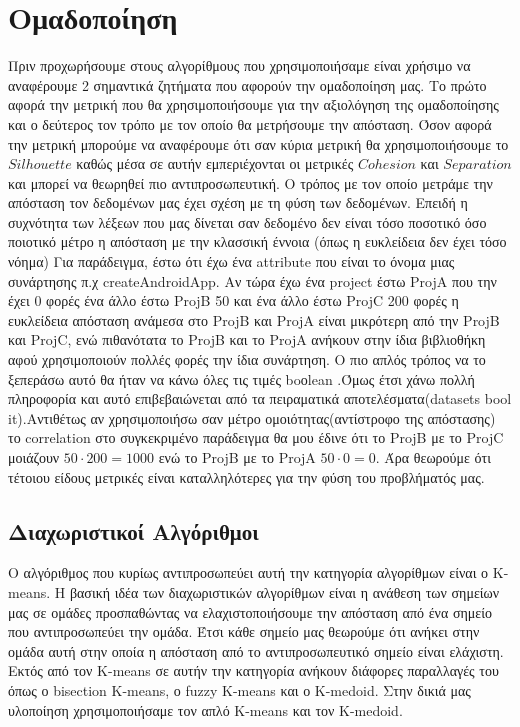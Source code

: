 \chapter{Ομαδοποίηση}
Πριν προχωρήσουμε στους αλγορίθμους που χρησιμοποιήσαμε είναι χρήσιμο να αναφέρουμε 2 σημαντικά ζητήματα που αφορούν την ομαδοποίηση μας. Το πρώτο αφορά την μετρική που θα χρησιμοποιήσουμε για την αξιολόγηση της ομαδοποίησης και ο δεύτερος τον τρόπο με τον οποίο θα μετρήσουμε την απόσταση. Όσον αφορά την μετρική μπορούμε να αναφέρουμε ότι σαν κύρια μετρική θα χρησιμοποιήσουμε το $Silhouette$ καθώς μέσα σε αυτήν εμπεριέχονται οι μετρικές $Cohesion$ και $Separation$ και μπορεί να θεωρηθεί πιο αντιπροσωπευτική.
Ο τρόπος με τον οποίο μετράμε την απόσταση τον δεδομένων μας έχει σχέση με τη φύση των δεδομένων.
Επειδή η συχνότητα των λέξεων που μας
δίνεται σαν δεδομένο δεν είναι τόσο ποσοτικό  όσο ποιοτικό μέτρο η απόσταση με την κλασσική έννοια (όπως η ευκλείδεια δεν έχει τόσο νόημα)
Για παράδειγμα, έστω ότι έχω ένα attribute που είναι το όνομα μιας συνάρτησης π.χ createAndroidApp.
Αν τώρα έχω ένα project έστω ProjA  που την έχει 0 φορές ένα άλλο έστω ProjB 50 και ένα άλλο έστω ProjC 200 φορές
η ευκλείδεια απόσταση ανάμεσα στο ProjB και ProjA είναι μικρότερη από την ProjB και ProjC, ενώ πιθανότατα το ProjB και το ProjA ανήκουν στην ίδια βιβλιοθήκη αφού χρησιμοποιούν πολλές φορές την ίδια συνάρτηση. Ο πιο απλός τρόπος να το ξεπεράσω αυτό θα ήταν να κάνω όλες τις τιμές boοlean .Όμως έτσι χάνω πολλή πληροφορία και αυτό επιβεβαιώνεται από τα πειραματικά αποτελέσματα(datasets bool it).Αντιθέτως αν χρησιμοποιήσω σαν μέτρο ομοιότητας(αντίστροφο της απόστασης) το correlation στο συγκεκριμένο παράδειγμα θα μου έδινε ότι το ProjB με το ProjC μοιάζουν $50\cdot200=1000$
ενώ το ProjB με το ProjA $50\cdot0=0$.
Άρα θεωρούμε ότι τέτοιου είδους μετρικές είναι καταλληλότερες για την φύση του προβλήματός μας.

\section{Διαχωριστικοί Αλγόριθμοι}
Ο αλγόριθμος που κυρίως αντιπροσωπεύει αυτή την κατηγορία αλγορίθμων είναι ο K-means. Η βασική ιδέα των διαχωριστικών αλγορίθμων είναι η ανάθεση των σημείων μας σε ομάδες προσπαθώντας να ελαχιστοποιήσουμε την απόσταση από ένα σημείο που αντιπροσωπεύει την ομάδα. Έτσι κάθε σημείο μας θεωρούμε ότι ανήκει στην ομάδα αυτή στην οποία η απόσταση από το αντιπροσωπευτικό σημείο είναι ελάχιστη. Εκτός από τον K-means σε αυτήν την κατηγορία ανήκουν διάφορες παραλλαγές του όπως ο bisection K-means, ο fuzzy Κ-means και ο K-medoid. Στην δικιά μας υλοποίηση χρησιμοποιήσαμε τον απλό K-means και τον K-medoid.

